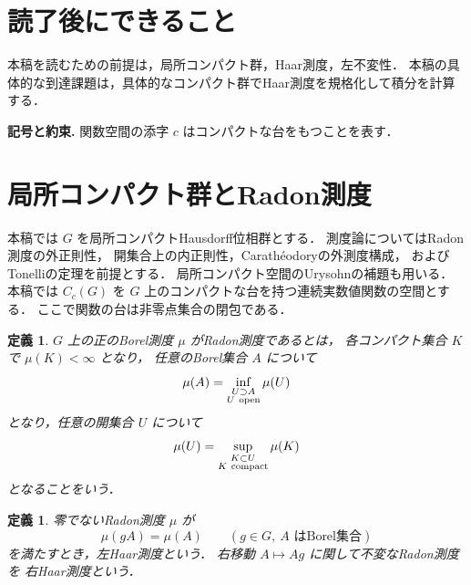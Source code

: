 \documentclass[a5paper,10pt,onecolumn]{jsarticle}
\theoremstyle{mathnotetheorem}
\newtheorem{definition}[theorem]{定義}
\begin{document}
\section*{読了後にできること}
本稿を読むための前提は，局所コンパクト群，Haar測度，左不変性．
本稿の具体的な到達課題は，具体的なコンパクト群でHaar測度を規格化して積分を計算する．


\par\noindent\textbf{記号と約束.}\quad
関数空間の添字 $c$ はコンパクトな台をもつことを表す．
\par

\section{局所コンパクト群とRadon測度}

本稿では $G$ を局所コンパクトHausdorff位相群とする．
測度論についてはRadon測度の外正則性，
開集合上の内正則性，Carath\'eodoryの外測度構成，
およびTonelliの定理を前提とする．
局所コンパクト空間のUrysohnの補題も用いる．
本稿では $C_c(G)$ を $G$ 上のコンパクトな台を持つ連続実数値関数の空間とする．
ここで関数の台は非零点集合の閉包である．

\begin{definition}
$G$ 上の正のBorel測度 $\mu$ が\emph{Radon測度}であるとは，
各コンパクト集合 $K$ で $\mu(K)<\infty$ となり，
任意のBorel集合 $A$ について
\[
 \mu(A)=\inf_{\substack{U\supset A\\U\ {\rm open}}}\mu(U)
\]
となり，任意の開集合 $U$ について
\[
 \mu(U)=\sup_{\substack{K\subset U\\K\ {\rm compact}}}\mu(K)
\]
となることをいう．
\end{definition}

\begin{definition}
零でないRadon測度 $\mu$ が
\[
 \mu(gA)=\mu(A)
 \qquad(g\in G,\ A\text{ はBorel集合})
\]
を満たすとき，\emph{左Haar測度}という．
右移動 $A\mapsto Ag$ に関して不変なRadon測度を
右Haar測度という．
\end{definition}
\end{document}
